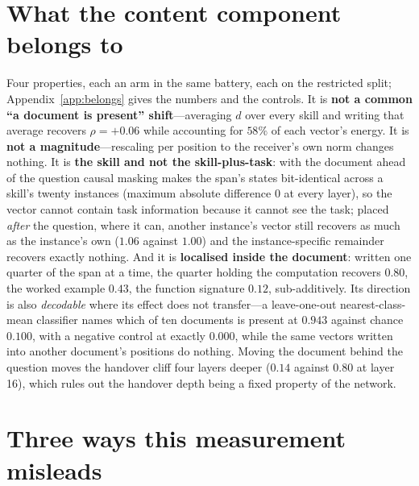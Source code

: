 \documentclass{article}
\newcommand{\dvec}{\ensuremath{d}}
\begin{document}
\section{What the content component belongs to}
\label{sec:whose}

Four properties, each an arm in the same battery, each on the restricted split;
Appendix~\ref{app:belongs} gives the numbers and the controls. It is
\textbf{not a common ``a document is present'' shift}---averaging $\dvec$ over
every skill and writing that average recovers $\rho=+0.06$ while accounting for
$58\%$ of each vector's energy. It is \textbf{not a magnitude}---rescaling per
position to the receiver's own norm changes nothing. It is \textbf{the skill and
not the skill-plus-task}: with the document ahead of the question causal masking
makes the span's states bit-identical across a skill's twenty instances (maximum
absolute difference $0$ at every layer), so the vector cannot contain task
information because it cannot see the task; placed \emph{after} the question,
where it can, another instance's vector still recovers as much as the instance's
own ($1.06$ against $1.00$) and the instance-specific remainder recovers exactly
nothing. And it is \textbf{localised inside the document}: written one quarter of
the span at a time, the quarter holding the computation recovers $0.80$, the
worked example $0.43$, the function signature $0.12$, sub-additively. Its
direction is also \emph{decodable} where its effect does not transfer---a
leave-one-out nearest-class-mean classifier names which of ten documents is
present at $0.943$ against chance $0.100$, with a negative control at exactly
$0.000$, while the same vectors written into another document's positions do
nothing. Moving the document behind the question moves the handover cliff four
layers deeper ($0.14$ against $0.80$ at layer 16), which rules out the handover
depth being a fixed property of the network.

\section{Three ways this measurement misleads}
\label{sec:traps}
\end{document}
